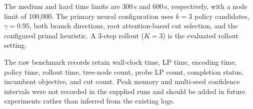 \documentclass{article}
\begin{document}
The medium and hard time limits are 300\,s and 600\,s, respectively, with a node limit of 100,000. The primary neural configuration uses $k=3$ policy candidates, $\gamma=0.95$, both branch directions, root attention-based cut selection, and the configured primal heuristic. A 3-step rollout ($K=3$) is the evaluated rollout setting.

The raw benchmark records retain wall-clock time, LP time, encoding time, policy time, rollout time, tree-node count, probe LP count, completion status, incumbent objective, and cut count. Peak memory and multi-seed confidence intervals were not recorded in the supplied runs and should be added in future experiments rather than inferred from the existing logs.
\end{document}

